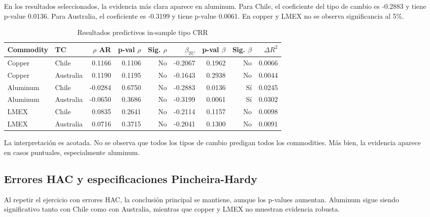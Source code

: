 \documentclass[11pt,letterpaper]{article}
\begin{document}
En los resultados seleccionados, la evidencia más clara aparece en aluminum. Para Chile, el coeficiente del tipo de cambio es -0.2883 y tiene p-value 0.0136. Para Australia, el coeficiente es -0.3199 y tiene p-value 0.0061. En copper y LMEX no se observa significancia al 5\%.

\begin{table}[H]
\centering
\caption{Resultados predictivos in-sample tipo CRR}
\scriptsize
\begin{tabular}{llrrrrrrr}
\toprule
Commodity & TC & $\rho$ AR & p-val $\rho$ & Sig. $\rho$ & $\beta_{TC}$ & p-val $\beta$ & Sig. $\beta$ & $\Delta R^2$ \\
\midrule
Copper & Chile & 0.1166 & 0.1106 & No & -0.2067 & 0.1962 & No & 0.0066 \\
Copper & Australia & 0.1190 & 0.1195 & No & -0.1643 & 0.2938 & No & 0.0044 \\
Aluminum & Chile & -0.0284 & 0.6750 & No & -0.2883 & 0.0136 & Sí & 0.0245 \\
Aluminum & Australia & -0.0650 & 0.3686 & No & -0.3199 & 0.0061 & Sí & 0.0302 \\
LMEX & Chile & 0.0835 & 0.2641 & No & -0.2114 & 0.1157 & No & 0.0098 \\
LMEX & Australia & 0.0716 & 0.3715 & No & -0.2041 & 0.1300 & No & 0.0091 \\
\bottomrule
\end{tabular}
\end{table}

La interpretación es acotada. No se observa que todos los tipos de cambio predigan todos los commodities. Más bien, la evidencia aparece en casos puntuales, especialmente aluminum.

\subsection{Errores HAC y especificaciones Pincheira-Hardy}

Al repetir el ejercicio con errores HAC, la conclusión principal se mantiene, aunque los p-values aumentan. Aluminum sigue siendo significativo tanto con Chile como con Australia, mientras que copper y LMEX no muestran evidencia robusta.
\end{document}
